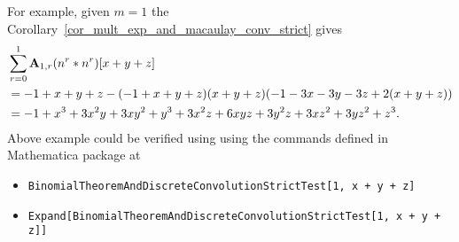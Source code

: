 For example, given $m=1$ the Corollary~\ref{cor_mult_exp_and_macaulay_conv_strict} gives
\begin{equation*}
    \begin{split}
        &\sum_{r=0}^{1} {\mathbf{A}} \sb{1,r} (n \sp{r} \ast n \sp{r}) [x+y+z] \\
        &=-1 + x + y + z - (-1 + x + y + z) (x + y + z) (-1 - 3 x - 3 y - 3 z + 2 (x + y + z)) \\
        &=-1 + x^3 + 3 x^2 y + 3 x y^2 + y^3 + 3 x^2 z + 6 x y z + 3 y^2 z + 3 x z^2 + 3 y z^2 + z^3.
    \end{split}
\end{equation*}
Above example could be verified using using the commands defined in Mathematica package at~\cite{PK22Source}
\begin{itemize}
    \item \texttt{BinomialTheoremAndDiscreteConvolutionStrictTest[1, x + y + z]}
    \item \texttt{Expand[BinomialTheoremAndDiscreteConvolutionStrictTest[1, x + y + z]]}
\end{itemize}
